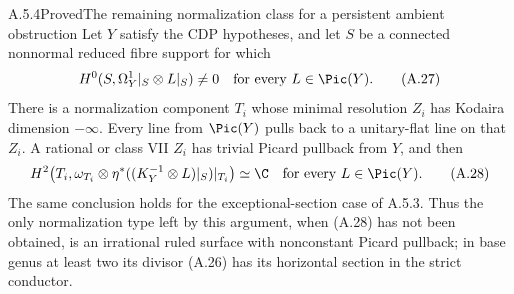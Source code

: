 \begin{statement}{A.5.4}{Proved}{The remaining normalization class for a persistent ambient obstruction}
Let $Y$ satisfy the CDP hypotheses, and let $S$ be a connected nonnormal reduced fibre support for which
\[
 H^0(S,\Omega_Y^1|_S\otimes L|_S)\ne0
 \quad\hbox{for every }L\in\Pic(Y).
 \tag{A.27}
\]
There is a normalization component $T_i$ whose minimal resolution $Z_i$ has Kodaira dimension $-\infty$. Every line from $\Pic(Y)$ pulls back to a unitary-flat line on that $Z_i$. A rational or class VII $Z_i$ has trivial Picard pullback from $Y$, and then
\[
 H^2\!\left(T_i,\omega_{T_i}\otimes
             \eta^*((K_Y^{-1}\otimes L)|_S)|_{T_i}\right)\simeq\C
 \quad\hbox{for every }L\in\Pic(Y).
 \tag{A.28}
\]
The same conclusion holds for the exceptional-section case of A.5.3. Thus the only normalization type left by this argument, when (A.28) has not been obtained, is an irrational ruled surface with nonconstant Picard pullback; in base genus at least two its divisor (A.26) has its horizontal section in the strict conductor.
\end{statement}
